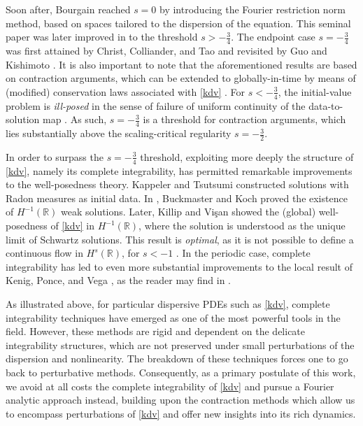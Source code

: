 \documentclass[%
11pt,  reqno]{amsart}
\newcommand{\5}{\textup{V}}
\theoremstyle{remark}
\newcommand{\R}{\mathbb{R}}
\numberwithin{equation}{section}
\numberwithin{theorem}{section}
\begin{document}
\medskip


Soon after, Bourgain \cite{bourg2} reached $s=0$ by introducing the Fourier restriction norm method, 
based on spaces tailored to the dispersion of the equation. This seminal paper was later improved in \cite{kpv_bilin} to the threshold $s>-\frac34$. The endpoint case $s=-\frac34$ was first attained by Christ, Colliander, and Tao \cite{CCT_ill} and revisited by Guo \cite{Guo_gwp} and Kishimoto \cite{Kishimoto_lwp_crit}. It is also important to note that the aforementioned results are based on contraction arguments, which can be extended to globally-in-time by means 
 of (modified) conservation laws associated with \eqref{kdv}  \cite{bourg2, CKSTT_sharp_kdv, Guo_gwp}. For $s<-\frac34$, the initial-value problem is \emph{ill-posed} in the sense of failure of uniform continuity of the data-to-solution map \cite{KPV_ill}. As such, $s=-\frac34$ is a threshold for contraction arguments, which lies substantially above the 
scaling-critical regularity $s=-\frac32$. 



\medskip

In order to surpass the $s=-\frac34$ threshold, exploiting more deeply the structure of \eqref{kdv}, namely its complete integrability, has 
permitted remarkable improvements to the well-posedness theory. Kappeler \cite{Kappeler_rough} and Tsutsumi \cite{Tsutsumi_kdv_measures} constructed solutions with Radon measures as initial data. In \cite{BuckmasterKoch}, Buckmaster and Koch proved the existence of $H^{-1}(\R)$ weak solutions. Later, Killip and Vi\c{s}an \cite{KillipVisan_kdv} showed the (global) well-posedness of \eqref{kdv} in $H^{-1}(\R)$, where the solution is understood as the unique limit of Schwartz solutions. This result is \emph{optimal}, as it is not possible to define a continuous flow in $H^s(\R)$, for $s<-1$ \cite{Molinet_ill_line}. In the periodic case, complete integrability has led to even more substantial improvements to the local result of Kenig, Ponce, and Vega \cite{kpv_bilin}, {as the reader may find in }\cite{KMMT16, KappelerMolnar18, KT06, KillipVisan_kdv}.

	
	\medskip


As illustrated above, for particular dispersive PDEs such as \eqref{kdv}, complete integrability techniques 
have emerged as one of the most powerful tools in the field. 
However, these methods are rigid and dependent on the delicate integrability structures, which are not preserved under small perturbations of the dispersion and nonlinearity. 
The breakdown of these techniques forces one to go back to perturbative methods.
Consequently, 
as a primary postulate of this work, we 
avoid at all costs the complete integrability of \eqref{kdv} and pursue a Fourier analytic approach instead,
building upon the contraction methods which allow us to encompass perturbations of \eqref{kdv} and offer new insights into its rich dynamics.
\end{document}
